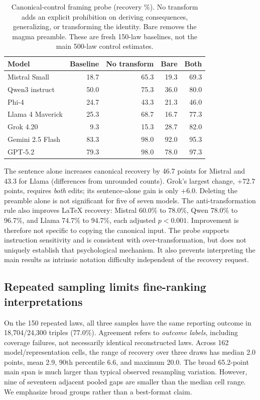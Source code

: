 \documentclass{article}
\newcommand{\pct}{\%}
\begin{document}
\begin{table}[t]
\centering
\small
\caption{Canonical-control framing probe (recovery \pct). No transform adds an
explicit prohibition on deriving consequences, generalizing, or transforming
the identity. Bare removes the magma preamble. These are fresh 150-law baselines,
not the main 500-law control estimates.}
\label{tab:framing}
\begin{tabular}{lrrrr}
\toprule
Model & Baseline & No transform & Bare & Both \\
\midrule
Mistral Small & 18.7 & 65.3 & 19.3 & 69.3 \\
Qwen3 instruct & 50.0 & 75.3 & 36.0 & 80.0 \\
Phi-4 & 24.7 & 43.3 & 21.3 & 46.0 \\
Llama 4 Maverick & 25.3 & 68.7 & 16.7 & 77.3 \\
Grok 4.20 & 9.3 & 15.3 & 28.7 & 82.0 \\
Gemini 2.5 Flash & 83.3 & 98.0 & 92.0 & 95.3 \\
GPT-5.2 & 79.3 & 98.0 & 78.0 & 97.3 \\
\bottomrule
\end{tabular}
\end{table}

The sentence alone increases canonical recovery by 46.7 points for Mistral and
43.3 for Llama (differences from unrounded counts). Grok's largest change,
+72.7 points, requires \emph{both} edits; its sentence-alone gain is only
+6.0. Deleting the preamble alone is not significant for five of seven models.
The anti-transformation rule also improves LaTeX recovery: Mistral
60.0\pct{} to 78.0\pct{}, Qwen 78.0\pct{} to 96.7\pct{}, and Llama
74.7\pct{} to 94.7\pct{}, each adjusted $p<0.001$.
Improvement is therefore not specific to copying the canonical input.
The probe supports instruction sensitivity and is consistent with
over-transformation, but does not uniquely establish that psychological
mechanism. It also prevents interpreting the main results as intrinsic notation
difficulty independent of the recovery request.

\subsection{Repeated sampling limits fine-ranking interpretations}

On the 150 repeated laws, all three samples have the same reporting outcome in
18,704/24,300 triples (77.0\pct{}). Agreement refers to \emph{outcome labels},
including coverage failures, not necessarily identical reconstructed laws.
Across 162 model/representation cells, the range of recovery over three draws
has median 2.0 points, mean 2.9, 90th percentile 6.6, and maximum 20.0.
The broad 65.2-point main span is much larger than typical observed resampling
variation. However, nine of seventeen adjacent pooled gaps are smaller than the
median cell range. We emphasize broad groups rather than a best-format claim.
\end{document}
